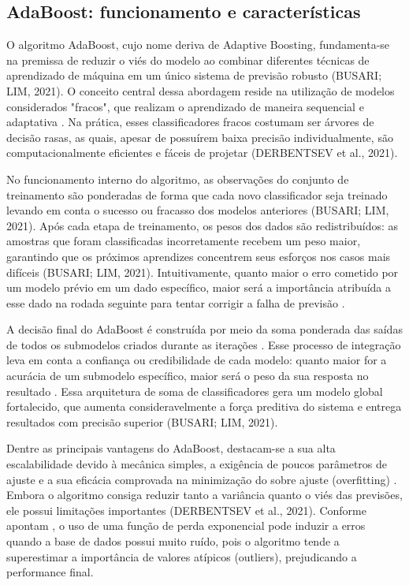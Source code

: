 \subsection{AdaBoost: funcionamento e características}
\label{subsec_adaboost_funcionamento_e_caracteristicas}

O algoritmo AdaBoost, cujo nome deriva de Adaptive Boosting, fundamenta-se na premissa de reduzir o viés do modelo ao combinar diferentes técnicas de aprendizado de máquina em um único sistema de previsão robusto (BUSARI; LIM, 2021). O conceito central dessa abordagem reside na utilização de modelos considerados "fracos", que realizam o aprendizado de maneira sequencial e adaptativa \cite{park2023intelligent}. Na prática, esses classificadores fracos costumam ser árvores de decisão rasas, as quais, apesar de possuírem baixa precisão individualmente, são computacionalmente eficientes e fáceis de projetar (DERBENTSEV et al., 2021).

No funcionamento interno do algoritmo, as observações do conjunto de treinamento são ponderadas de forma que cada novo classificador seja treinado levando em conta o sucesso ou fracasso dos modelos anteriores (BUSARI; LIM, 2021). Após cada etapa de treinamento, os pesos dos dados são redistribuídos: as amostras que foram classificadas incorretamente recebem um peso maior, garantindo que os próximos aprendizes concentrem seus esforços nos casos mais difíceis (BUSARI; LIM, 2021). Intuitivamente, quanto maior o erro cometido por um modelo prévio em um dado específico, maior será a importância atribuída a esse dado na rodada seguinte para tentar corrigir a falha de previsão \cite{park2023intelligent}.

A decisão final do AdaBoost é construída por meio da soma ponderada das saídas de todos os submodelos criados durante as iterações \cite{park2023intelligent}. Esse processo de integração leva em conta a confiança ou credibilidade de cada modelo: quanto maior for a acurácia de um submodelo específico, maior será o peso da sua resposta no resultado \cite{park2023intelligent}. Essa arquitetura de soma de classificadores gera um modelo global fortalecido, que aumenta consideravelmente a força preditiva do sistema e entrega resultados com precisão superior (BUSARI; LIM, 2021).

Dentre as principais vantagens do AdaBoost, destacam-se a sua alta escalabilidade devido à mecânica simples, a exigência de poucos parâmetros de ajuste e a sua eficácia comprovada na minimização do sobre ajuste (overfitting) \cite{park2023intelligent}. Embora o algoritmo consiga reduzir tanto a variância quanto o viés das previsões, ele possui limitações importantes (DERBENTSEV et al., 2021). Conforme apontam , o uso de uma função de perda exponencial pode induzir a erros quando a base de dados possui muito ruído, pois o algoritmo tende a superestimar a importância de valores atípicos (outliers), prejudicando a performance final.

